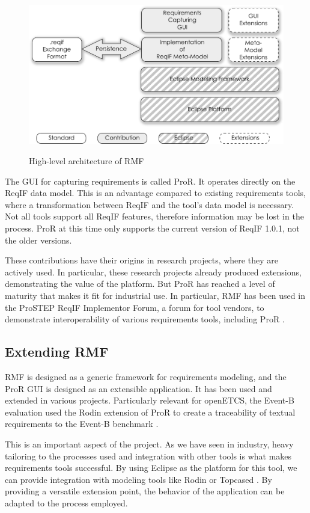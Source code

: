 \documentclass{template/openetcs_report}
\begin{document}
\begin{figure}[h!t]
	\begin{center}
	\includegraphics[width=.8\textwidth]{img/architecture.pdf}
	\label{fig:architecture}
	\end{center}
	\caption{High-level architecture of RMF}
\end{figure}

The GUI for capturing requirements is called ProR.  It operates directly on the ReqIF data model.  This is an advantage compared to existing requirements tools, where a transformation between ReqIF and the tool's data model is necessary.  Not all tools support all ReqIF features, therefore information may be lost in the process.  ProR at this time only supports the current version of ReqIF 1.0.1, not the older versions.

These contributions have their origins in research projects, where they are actively used. In particular, these research projects already produced extensions, demonstrating the value of the platform.  But ProR has reached a level of maturity that makes it fit for industrial use.  In particular, RMF has been used in the ProSTEP ReqIF Implementor Forum, a forum for tool vendors, to demonstrate interoperability of various requirements tools, including ProR \cite{prostep_if}.

\subsection{Extending RMF}

RMF is designed as a generic framework for requirements modeling, and the ProR GUI is designed as an extensible application.  It has been used and extended in various projects. Particularly relevant for openETCS, the Event-B evaluation used the Rodin extension of ProR to create a traceability of textual requirements to the Event-B benchmark \cite{event_b_benchmark}.

This is an important aspect of the project.  As we have seen in industry, heavy tailoring to the processes used and integration with other tools is what makes requirements tools successful.  By using Eclipse as the platform for this tool, we can provide integration with modeling tools like Rodin \cite{jastram_forms_2012} or Topcased \cite{topcase-JaGr2011}.  By providing a versatile extension point, the behavior of the application can be adapted to the process employed.
\end{document}
